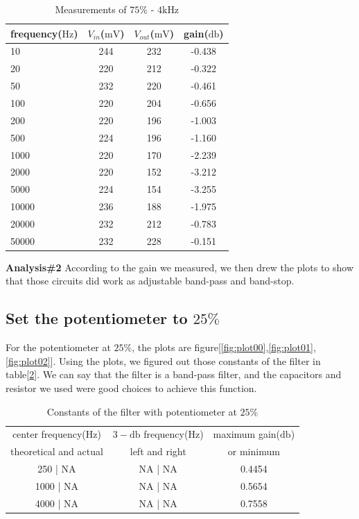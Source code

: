 \begin{table}[!htbp]
	\centering
	\caption{Measurements of $75\%$ - $4\si{\kilo\hertz}$}
	\label{tab:data22}
	\begin{tabular}{lccc}
		\toprule
		frequency($\si{\hertz}$) & $V_{in}$($\si{\milli\volt}$) & $V_{out}$($\si{\milli\volt}$) & gain($\si{\decibel}$) \\
		\midrule
		10&	244&	232&	-0.438\\
		20&	220&	212&	-0.322\\
		50&	232&	220&	-0.461\\
		100&	220&	204&	-0.656\\
		200&	220&	196&	-1.003\\
		500&	224&	196&	-1.160\\
		1000&	220&	170&	-2.239\\
		2000&	220&	152&	-3.212\\
		5000&	224&	154&	-3.255\\
		10000&	236&	188&	-1.975\\
		20000&	232&	212&	-0.783\\
		50000&	232&	228&	-0.151\\
		\bottomrule
	\end{tabular}
\end{table}

\hfill \newline
\textbf{Analysis\#2} \newline
\phantom{ } According to the gain we measured, we then drew the plots to show that those circuits did work as adjustable band-pass and band-stop. 
\subsection{Set the potentiometer to $25\%$}
For the potentiometer at $25\%$, the plots are figure[\ref{fig:plot00},\ref{fig:plot01},\ref{fig:plot02}]. Using the plots, we figured out those constants of the filter in table[\ref{tab:cnst0}]. We can say that the filter is a band-pass filter, and the capacitors and resistor we used were good choices to achieve this function.

\begin{table}[!htbp]
	\centering
	\caption{Constants of the filter with potentiometer at $25\%$}
	\label{tab:cnst0}
	\begin{tabular}{ccc}
		\toprule
		center frequency($\si{\hertz}$) & $3-\si{\decibel}$ frequency($\si{\hertz}$) & maximum gain($\si{\decibel}$) \\
		theoretical and actual & left and right & or minimum\\
		\midrule
		250 | NA & NA | NA & 0.4454\\
		1000 | NA & NA | NA & 0.5654\\
		4000 | NA & NA | NA & 0.7558\\
		\bottomrule
	\end{tabular}
\end{table}

